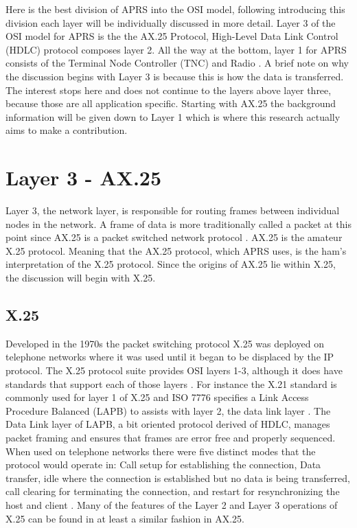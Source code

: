 Here is the best division of APRS into the OSI model, following introducing this division each layer will be individually discussed in more detail. Layer 3 of the OSI model for APRS is the the AX.25 Protocol,  High-Level Data Link Control (HDLC) protocol composes layer 2. All the way at the bottom, layer 1 for APRS consists of the Terminal Node Controller (TNC) and Radio \cite{Silver2013}. A brief note on why the discussion begins with Layer 3 is because this is how the data is transferred. The interest stops here and does not continue to the layers above layer three, because those are all application specific. Starting with AX.25 the background information will be given down to Layer 1 which is where this research actually aims to make a contribution.

\section{Layer 3 - AX.25}
Layer 3, the network layer, is responsible for routing frames between individual nodes in the network. A frame of data is more traditionally called a packet at this point since AX.25 is a packet switched network protocol \cite{Peterson2011}. AX.25 is the amateur X.25 protocol. Meaning that the AX.25 protocol, which APRS uses, is the ham's interpretation of the X.25 protocol. Since the origins of AX.25 lie within X.25, the discussion will begin with X.25. 

\subsection{X.25}
Developed in the 1970s the packet switching protocol X.25 was deployed on telephone networks where it was used until it began to be displaced by the IP protocol. The X.25 protocol suite provides OSI layers 1-3, although it does have standards that support each of those layers \cite{Sosinsky2009}. For instance the X.21 standard is commonly used for layer 1 of X.25 and ISO 7776 specifies a Link Access Procedure Balanced (LAPB) to assists with layer 2, the data link layer \cite{Gallagher1997}. The Data Link layer of LAPB, a bit oriented protocol derived of HDLC,  manages packet framing and ensures that frames are error free and properly sequenced. When used on telephone networks there were five distinct modes that the protocol would operate in: Call setup for establishing the connection, Data transfer, idle where the connection is established but no data is being transferred, call clearing for terminating the connection, and restart for resynchronizing the host and client \cite{Javvin2006}. Many of the features of the Layer 2 and Layer 3 operations of X.25 can be found in at least a similar fashion in AX.25.

